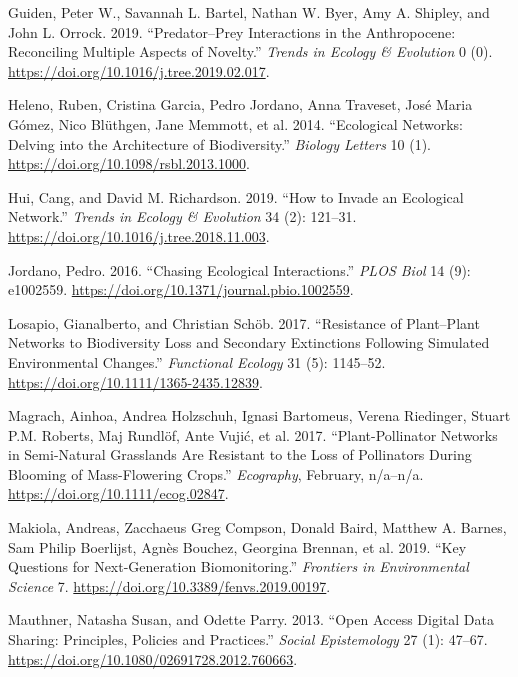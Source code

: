 \documentclass[11pt]{article}
\begin{document}
\leavevmode\hypertarget{ref-GuidBart19}{}%
Guiden, Peter W., Savannah L. Bartel, Nathan W. Byer, Amy A. Shipley,
and John L. Orrock. 2019. ``Predator--Prey Interactions in the
Anthropocene: Reconciling Multiple Aspects of Novelty.'' \emph{Trends in
Ecology \& Evolution} 0 (0).
\url{https://doi.org/10.1016/j.tree.2019.02.017}.

\leavevmode\hypertarget{ref-HeleGarc14}{}%
Heleno, Ruben, Cristina Garcia, Pedro Jordano, Anna Traveset, José Maria
Gómez, Nico Blüthgen, Jane Memmott, et al. 2014. ``Ecological Networks:
Delving into the Architecture of Biodiversity.'' \emph{Biology Letters}
10 (1). \url{https://doi.org/10.1098/rsbl.2013.1000}.

\leavevmode\hypertarget{ref-HuiRich19}{}%
Hui, Cang, and David M. Richardson. 2019. ``How to Invade an Ecological
Network.'' \emph{Trends in Ecology \& Evolution} 34 (2): 121--31.
\url{https://doi.org/10.1016/j.tree.2018.11.003}.

\leavevmode\hypertarget{ref-Jord16}{}%
Jordano, Pedro. 2016. ``Chasing Ecological Interactions.'' \emph{PLOS
Biol} 14 (9): e1002559.
\url{https://doi.org/10.1371/journal.pbio.1002559}.

\leavevmode\hypertarget{ref-LosaScho17}{}%
Losapio, Gianalberto, and Christian Schöb. 2017. ``Resistance of
Plant--Plant Networks to Biodiversity Loss and Secondary Extinctions
Following Simulated Environmental Changes.'' \emph{Functional Ecology}
31 (5): 1145--52. \url{https://doi.org/10.1111/1365-2435.12839}.

\leavevmode\hypertarget{ref-MagrHolz17}{}%
Magrach, Ainhoa, Andrea Holzschuh, Ignasi Bartomeus, Verena Riedinger,
Stuart P.M. Roberts, Maj Rundlöf, Ante Vujić, et al. 2017.
``Plant-Pollinator Networks in Semi-Natural Grasslands Are Resistant to
the Loss of Pollinators During Blooming of Mass-Flowering Crops.''
\emph{Ecography}, February, n/a--n/a.
\url{https://doi.org/10.1111/ecog.02847}.

\leavevmode\hypertarget{ref-MakiComp19}{}%
Makiola, Andreas, Zacchaeus Greg Compson, Donald Baird, Matthew A.
Barnes, Sam Philip Boerlijst, Agnès Bouchez, Georgina Brennan, et al.
2019. ``Key Questions for Next-Generation Biomonitoring.''
\emph{Frontiers in Environmental Science} 7.
\url{https://doi.org/10.3389/fenvs.2019.00197}.

\leavevmode\hypertarget{ref-MautParr13}{}%
Mauthner, Natasha Susan, and Odette Parry. 2013. ``Open Access Digital
Data Sharing: Principles, Policies and Practices.'' \emph{Social
Epistemology} 27 (1): 47--67.
\url{https://doi.org/10.1080/02691728.2012.760663}.
\end{document}
